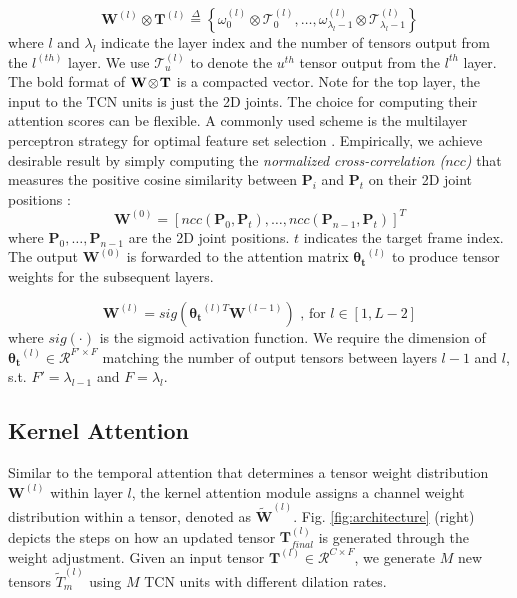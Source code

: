 \documentclass[twocolumn]{svjour3}          \smartqed  \usepackage{graphicx}
\begin{document}
\begin{equation}
\mathbf{W}^{(l)} \otimes \mathbf{T}^{(l)} \overset{\Delta}{=} \left\{\omega_{0}^{(l)}\otimes\mathcal{T}_0^{(l)}, \dots, \omega_{\lambda_l - 1}^{(l)}\otimes\mathcal{T}_{\lambda_l - 1}^{(l)}\right\}
\label{eq:weighttensor}
\end{equation}
where $l$ and $\lambda_l$ indicate the layer index and the number of tensors output from the $l^{(th)}$ layer. We use $\mathcal{T}_u^{(l)}$ to denote the $u^{th}$ tensor output from the $l^{th}$ layer. The bold format of $\mathbf{W} \hspace{-0.5mm}\otimes\hspace{-0.5mm} \mathbf{T}$ is a compacted vector. Note for the top layer, the input to the TCN units is just the 2D joints. The choice for computing their attention scores can be flexible. A commonly used scheme is the {multilayer perceptron} strategy for optimal feature set selection \citep{Ruck1990}. Empirically, we achieve desirable result by simply computing the \emph{normalized cross-correlation ($ncc$)} that measures the positive cosine similarity between $\mathbf{P}_i$ and $\mathbf{P}_t$ on their 2D joint positions  \citep{Yoo2009}: 
\begin{equation}
\mathbf{W}^{(0)} = \left[ncc(\mathbf{P}_0, \mathbf{P}_t), \dots, ncc(\mathbf{P}_{n-1}, \mathbf{P}_t)\right]^T
\end{equation}
where $\mathbf{P}_0, \dots, \mathbf{P}_{n-1}$  are the 2D joint positions. $t$ indicates the target frame index.
The output $\mathbf{W}^{(0)}$ is forwarded to the attention matrix $\boldsymbol{\theta_t}^{(l)}$ to produce tensor weights for the subsequent layers.

\begin{equation}
\mathbf{W}^{(l)} = sig\left(\boldsymbol{\theta_t}^{(l)T}\mathbf{W}^{(l-1)}\right) \mbox{ , for } l \in [1, L-2]\label{eq: theta}
\end{equation}
where $sig(\cdot)$ is the sigmoid activation function. We require the dimension of $\boldsymbol{\theta_t}^{(l)}\in \mathcal{R}^{F'\times F}$ matching the number of output tensors between layers $l-1$ and $l$, s.t. $F' = \lambda_{l-1}$ and $F = \lambda_l$. 


\subsection{Kernel Attention}
Similar to the temporal attention that determines a tensor weight distribution $\mathbf{W}^{(l)}$ within layer $l$, the kernel attention module assigns a channel weight distribution within a tensor, denoted as $\widetilde{\boldsymbol{W}}^{(l)}$. Fig. \ref{fig:architecture} (right) depicts the steps on how an updated tensor $\mathbf{T}_{final}^{(l)}$ is generated through the weight adjustment. Given an input tensor $\mathbf{T}^{(l)} \in \mathcal{R}^{C\times F}$, we generate $M$ new tensors $\widetilde{T}^{(l)}_m$ using $M$ TCN units with different dilation rates. 
\end{document}
